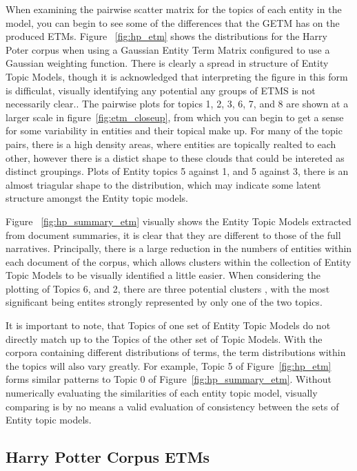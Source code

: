 \documentclass[10pt]{report}
\begin{document}
When examining the pairwise scatter matrix for the topics of each entity in the model, you can begin to see some of the differences that the GETM has on the produced ETMs. Figure ~\ref{fig:hp_etm} shows the distributions for the Harry Poter corpus when using a Gaussian Entity Term Matrix configured to use a Gaussian weighting function. There is clearly a spread in structure of Entity Topic Models, though it is acknowledged that interpreting the figure in this form is difficulat, visually identifying any potential any groups of ETMS is not necessarily clear.. The pairwise plots for topics 1, 2, 3, 6, 7, and 8 are shown at a larger scale in figure~\ref{fig:etm_closeup}, from which you can begin to get a sense for some variability in entities and their topical make up. For many of the topic pairs, there is a high density areas, where entities are topically realted to each other, however there is a distict shape to these clouds that could be intereted as distinct groupings. Plots of Entity topics 5 against 1, and 5 against 3, there is an almost triagular shape to the distribution, which may indicate some latent structure amongst the Entity topic models.

Figure ~\ref{fig:hp_summary_etm} visually shows the Entity Topic Models extracted from document summaries, it is clear that they are different to those of the full narratives. Principally, there is a large reduction in the numbers of entities within each document of the corpus, which allows clusters within the collection of Entity Topic Models to be visually identified a little easier. When considering the plotting of Topics 6, and 2, there are three potential clusters , with the most significant being entites strongly represented by only one of the two topics.

It is important to note, that Topics of one set of Entity Topic Models do not directly match up to the Topics of the other set of Topic Models. With the corpora containing different distributions of terms, the term distributions within the topics will also vary greatly. For example, Topic 5 of Figure~\ref{fig:hp_etm} forms similar patterns to Topic 0 of Figure~\ref{fig:hp_summary_etm}. Without numerically evaluating the similarities of each entity topic model, visually comparing is by no means a valid evaluation of consistency between the sets of Entity topic models.

\clearpage
\subsection{Harry Potter Corpus ETMs}
\end{document}
